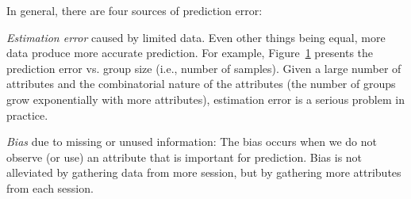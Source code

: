 In general, there are four sources of prediction error:

\begin{packedenumerate}
  \item \emph{Estimation error} caused by limited data.  Even other things being equal, more data produce more accurate prediction. For example, Figure~\ref{fig:group-size-impact} presents the prediction error vs. group size (i.e., number of samples). Given a large number of attributes and the combinatorial nature of the attributes (the number of groups grow exponentially with more attributes), estimation error is a serious problem in practice. 

\begin{figure}[h!]
\centering
{}
\label{fig:group-size-impact}
\end{figure}

\item \emph{Bias} due to missing or unused information: The bias occurs when we do not observe (or use) an attribute that is important for prediction. Bias is not alleviated by gathering data from more session, but by gathering more attributes from each session.


\end{packedenumerate}
